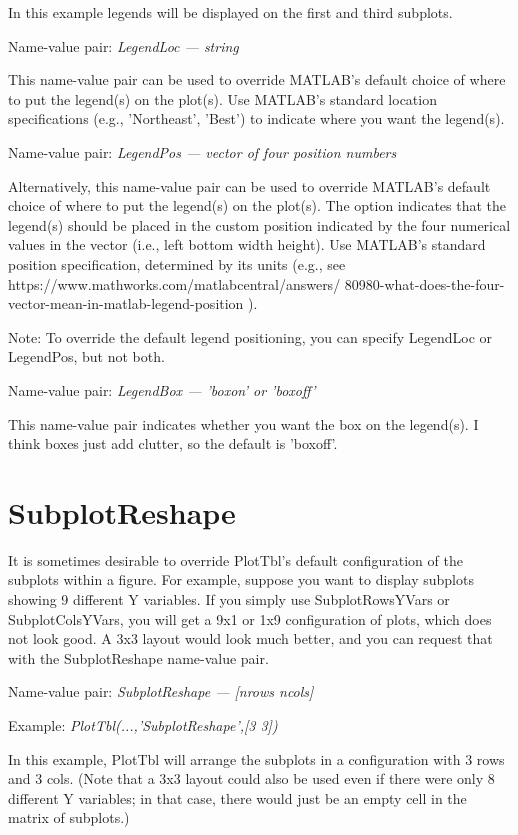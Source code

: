 \documentclass{article}
\newcommand{\example}[1]{Example: {\it #1}}
\newcommand{\namevalue}[2]{{\it #1 --- #2}}
\begin{document}
In this example legends will be displayed on the first and third subplots.

Name-value pair: \namevalue{LegendLoc}{string}

This name-value pair can be used to override MATLAB's default choice of where to
put the legend(s) on the plot(s).
Use MATLAB's standard location specifications (e.g., 'Northeast', 'Best')
to indicate where you want the legend(s).

Name-value pair: \namevalue{LegendPos}{vector of four position numbers}

Alternatively, this name-value pair can be used to override MATLAB's default choice of where to
put the legend(s) on the plot(s).
The option indicates that the legend(s) should be placed in the custom position
indicated by the four numerical values in the vector (i.e., left bottom width height).
Use MATLAB's standard position specification, determined by its units
(e.g., see https://www.mathworks.com/matlabcentral/answers/ 80980-what-does-the-four-vector-mean-in-matlab-legend-position ).

Note: To override the default legend positioning, you can specify LegendLoc or LegendPos, but not both.

Name-value pair: \namevalue{LegendBox}{'boxon' or 'boxoff'}

This name-value pair indicates whether you want the box on the legend(s).
I think boxes just add clutter, so the default is 'boxoff'.

\section{SubplotReshape}

It is sometimes desirable to override PlotTbl's default configuration of
the subplots within a figure.
For example, suppose you want to display subplots showing 9 different Y variables.
If you simply use SubplotRowsYVars or SubplotColsYVars, you will get a 9x1
or 1x9 configuration of plots, which does not look good.
A 3x3 layout would look much better, and you can request that with
the SubplotReshape name-value pair.

Name-value pair: \namevalue{SubplotReshape}{[nrows ncols]}

\example{PlotTbl(...,'SubplotReshape',[3 3])}

In this example, PlotTbl will arrange the subplots in a configuration with
3 rows and 3 cols.
(Note that a 3x3 layout could also be used even if there were only 8 different
Y variables; in that case, there would just be an empty cell in the matrix of
subplots.)
\end{document}
